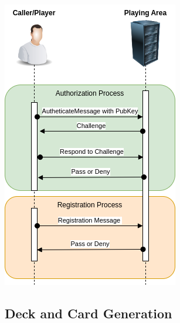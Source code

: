 \documentclass[11pt]{article}
\begin{document}
\begin{center}
\includegraphics{AuthenticateUML.png}
\end{center}
\clearpage

\subsection{Deck and Card Generation}
\end{document}
